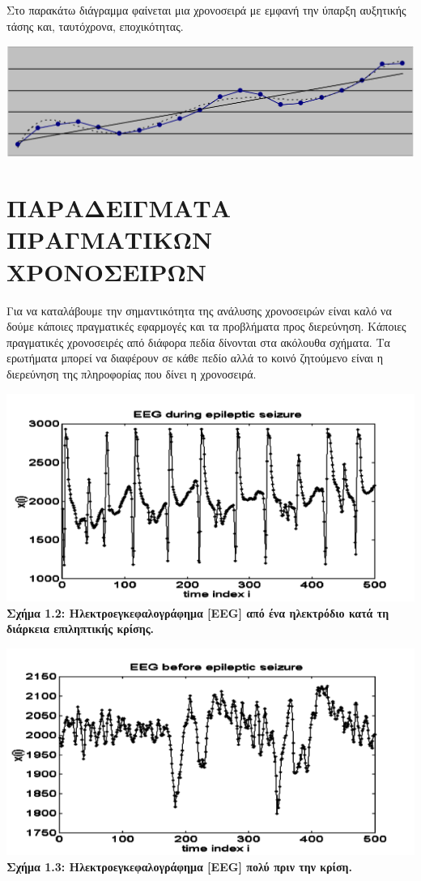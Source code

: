 Στο παρακάτω διάγραμμα φαίνεται μια χρονοσειρά με εμφανή την ύπαρξη αυξητικής
τάσης και, ταυτόχρονα, εποχικότητας.\\
\begin{center}
\includegraphics[scale=0.3]{graf4.png}
\end{center}
\section{ΠΑΡΑΔΕΙΓΜΑΤΑ ΠΡΑΓΜΑΤΙΚΩΝ ΧΡΟΝΟΣΕΙΡΩΝ}
Για να καταλάβουμε την σημαντικότητα της ανάλυσης χρονοσειρών είναι καλό
να δούμε κάποιες πραγματικές εφαρμογές και τα προβλήματα προς διερεύνηση. Κάποιες πραγματικές χρονοσειρές από διάφορα πεδία δίνονται στα ακόλουθα σχήματα. Τα
ερωτήματα μπορεί να διαφέρουν σε κάθε πεδίο αλλά το κοινό ζητούμενο είναι η
διερεύνηση της πληροφορίας που δίνει η χρονοσειρά.
\begin{center}
\includegraphics[scale=0.5]{graf5_1.png}\\
\textbf{Σχήμα 1.2: Ηλεκτροεγκεφαλογράφημα [EEG] από ένα ηλεκτρόδιο κατά τη διάρκεια επιληπτικής κρίσης.}
\end{center}
\begin{center}
\includegraphics[scale=0.5]{graf5_2.png}\\
\textbf{Σχήμα 1.3: Ηλεκτροεγκεφαλογράφημα [EEG] πολύ πριν την κρίση.}
\end{center}
